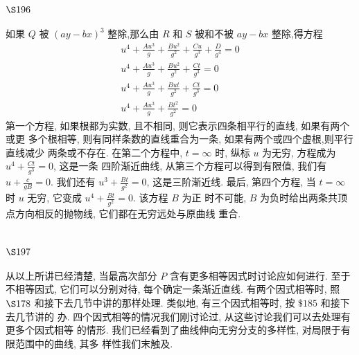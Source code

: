 \section{$\S 196$}

如果 $Q$ 被 $(a y-b x)^{3}$ 整除,那么由 $R$ 和 $S$ 被和不被 $a y-b x$ 整除,得方程
\[
\begin{gathered}
u^{4}+\frac{A u^{3}}{g}+\frac{B u^{2}}{g^{2}}+\frac{C u}{g^{3}}+\frac{D}{g^{4}}=0 \\
u^{4}+\frac{A u^{3}}{g}+\frac{B u^{2}}{g^{2}}+\frac{C t}{g^{3}}=0 \\
u^{4}+\frac{A u^{3}}{g}+\frac{B u t}{g^{2}}+\frac{C t}{g^{3}}=0 \\
u^{4}+\frac{A u^{3}}{g}+\frac{B t^{2}}{g^{2}}=0
\end{gathered}
\]
第一个方程, 如果根都为实数, 且不相同, 则它表示四条相平行的直线, 如果有两个或更 多个根相等, 则有同样条数的直线重合为一条, 如果有两个或四个虚根,则平行直线减少 两条或不存在. 在第二个方程中, $t=\infty$ 时, 纵标 $u$ 为无穷, 方程成为 $u^{4}+\frac{C t}{g^{3}}=0$, 这是一条 四阶渐近曲线, 从第三个方程可以得到有限值, 我们有 $u+\frac{c}{g B}=0$. 我们还有 $u^{3}+\frac{B t}{g^{2}}=0$, 这是三阶渐近线. 最后, 第四个方程, 当 $t=\infty$ 时 $u$ 无穷, 它变成 $u^{4}+\frac{B t}{g^{2}}=0$. 该方程 $B$ 为正 时不可能, $B$ 为负时给出两条共顶点方向相反的抛物线, 它们都在无穷远处与原曲线 重合.

\section{$\S 197$}

从以上所讲已经清楚, 当最高次部分 $P$ 含有更多相等因式时讨论应如何进行. 至于 不相等因式, 它们可以分别对待, 每个确定一条渐近直线. 有两个因式相等时, 照 $\S 178$ 和接下去几节中讲的那样处理. 类似地, 有三个因式相等时, 按 $\$ 185$ 和接下去几节讲的 办. 四个因式相等的情况我们刚讨论过, 从这些讨论我们可以去处理有更多个因式相等 的情形. 我们已经看到了曲线伸向无穷分支的多样性, 对局限于有限范围中的曲线, 其多 样性我们末触及. 


